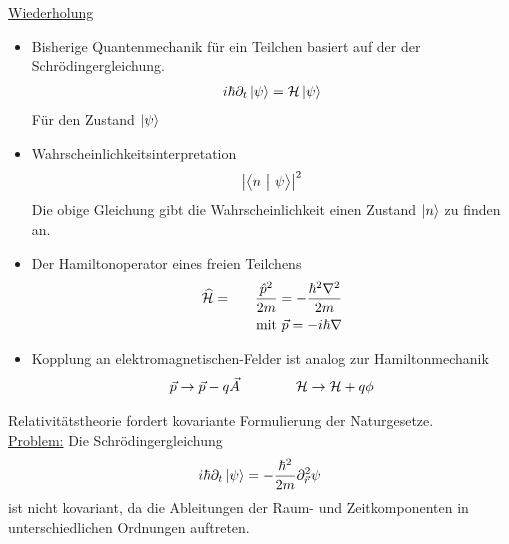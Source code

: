 
\underline{Wiederholung}
\begin{itemize}
\item Bisherige Quantenmechanik für ein Teilchen basiert auf der der Schrödingergleichung.
\begin{eqnarray*} i \hbar \partial_ t \left | \psi \right > = \mathcal H \left | \psi \right > \end{eqnarray*}
Für den Zustand $\left | \psi \right >$

\item Wahrscheinlichkeitsinterpretation
\begin{eqnarray*} \left |\left < n \ \big| \  \psi \right > \right |^2 \end{eqnarray*}
Die obige Gleichung gibt die Wahrscheinlichkeit einen Zustand $\left | n \right >$ zu finden an.

\item Der Hamiltonoperator eines freien Teilchens
\begin{eqnarray*} \widehat {\mathcal H}  &=& \frac{\hat p^2}{2 m} = - \frac {\hbar^2 \nabla ^ 2}{2 m}\\ 
&{}&\quad \text{mit   } \vec p = - i \hbar \nabla
\end{eqnarray*}
\item Kopplung an elektromagnetischen-Felder ist analog  zur Hamiltonmechanik
\begin{eqnarray*} \vec p \rightarrow \vec p - q \vec A \qquad  \qquad \mathcal H \rightarrow \mathcal H + q \phi \end{eqnarray*} 
\end{itemize}
Relativitätstheorie fordert kovariante Formulierung der Naturgesetze.\\
\underline{Problem:} Die Schrödingergleichung 
\begin{eqnarray*} i \hbar \partial_ t\left | \psi \right > = - \frac{\hbar ^2}{2 m} \partial_{ \vec r}^2 \psi\end{eqnarray*}
ist nicht kovariant, da die Ableitungen der Raum- und Zeitkomponenten in unterschiedlichen Ordnungen auftreten.


